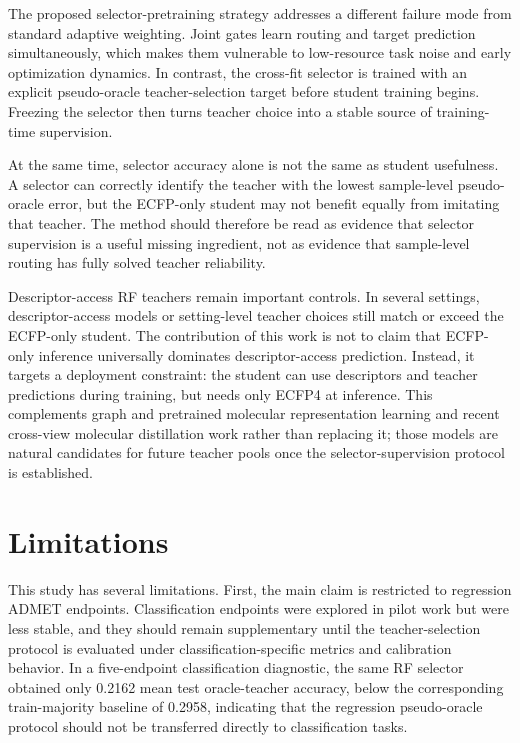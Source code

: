 \documentclass[11pt]{article}
\begin{document}
The proposed selector-pretraining strategy addresses a different failure mode
from standard adaptive weighting. Joint gates learn routing and target
prediction simultaneously, which makes them vulnerable to low-resource task
noise and early optimization dynamics. In contrast, the cross-fit selector is
trained with an explicit pseudo-oracle teacher-selection target before student
training begins. Freezing the selector then turns teacher choice into a stable
source of training-time supervision.

At the same time, selector accuracy alone is not the same as student
usefulness. A selector can correctly identify the teacher with the lowest
sample-level pseudo-oracle error, but the ECFP-only student may not benefit
equally from imitating that teacher. The method should therefore be read as
evidence that selector supervision is a useful missing ingredient, not as
evidence that sample-level routing has fully solved teacher reliability.

Descriptor-access RF teachers remain important controls. In several settings,
descriptor-access models or setting-level teacher choices still match or
exceed the ECFP-only student. The contribution of this work is not to claim
that ECFP-only inference universally dominates descriptor-access prediction.
Instead, it targets a deployment constraint: the student can use descriptors
and teacher predictions during training, but needs only ECFP4 at inference.
This complements graph and pretrained molecular representation learning
\cite{Yang2019DMPNN,Rong2020GROVER,Hu2020PretrainGNN,Liu2022GraphMVP,Heid2024Chemprop}
and recent cross-view molecular distillation work \cite{Zeng2024MolKD}
rather than replacing it; those models are natural candidates for future
teacher pools once the selector-supervision protocol is established.

\section{Limitations}

This study has several limitations. First, the main claim is restricted to
regression ADMET endpoints. Classification endpoints were explored in pilot
work but were less stable, and they should remain supplementary until the
teacher-selection protocol is evaluated under classification-specific metrics
and calibration behavior. In a five-endpoint classification diagnostic, the
same RF selector obtained only 0.2162 mean test oracle-teacher accuracy, below
the corresponding train-majority baseline of 0.2958, indicating that the
regression pseudo-oracle protocol should not be transferred directly to
classification tasks.
\end{document}
